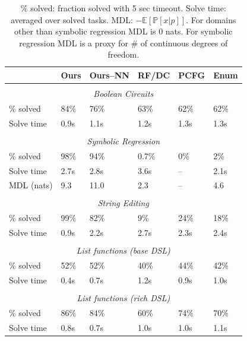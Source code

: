 \documentclass{article}
\newcommand{\expect}{\mathds{E}} %
\newcommand{\probability}{\mathds{P}} %
\begin{document}
\begin{table}
\tabcolsep=4pt
\renewcommand{\arraystretch}{0.5}
\begin{tabular}{llllll}
  \toprule& Ours&Ours--NN  & RF/DC & PCFG & Enum

  \\\midrule\\\multicolumn{6}{c}{\emph{Boolean Circuits}}\\\midrule
  \% solved &
  84\% &76\%& 63\%&62\%&62\%\\
  Solve time&  0.9s&  1.1s&1.2s&1.3s&1.3s

  \\\midrule\\\multicolumn{6}{c}{\emph{Symbolic Regression}}\\\midrule
  \% solved&    98\% &94\%&0.7\%&0\%&2\% \\
  Solve time&  2.7s& 2.8s  &3.6s&--&2.1s\\
  MDL (nats)&   9.3 &11.0&2.3&--&4.6

  \\\midrule\\\multicolumn{6}{c}{\emph{String Editing}}\\\midrule
  \% solved&99\% &82\% &9\%&24\%&18\%\\
  Solve time&  0.9s&2.2s&2.7s&2.3s&2.4s

  \\\midrule\\\multicolumn{6}{c}{\emph{List functions (base DSL)}}\\\midrule
  \% solved&52\% &52\% &40\%&44\%&42\%\\
  Solve time&  0.4s&0.7s&1.2s&0.9s&1.0s

  \\\midrule\\\multicolumn{6}{c}{\emph{List functions (rich DSL)}}\\\midrule
  \% solved&86\% &84\% &60\%&74\%&70\%\\
  Solve time&  0.8s&0.7s&1.0s&1.0s&1.1s
  \\\bottomrule
  \end{tabular}
\caption{\% solved: fraction solved with 5 sec timeout. Solve time: averaged over solved tasks. MDL: $-\expect\left[\probability[x|p] \right]$. For domains other than symbolic regression MDL is 0 nats. For symbolic regression MDL is a proxy for \# of continuous degrees of freedom.}\label{baselineComparisons}  \end{table}
\end{document}
